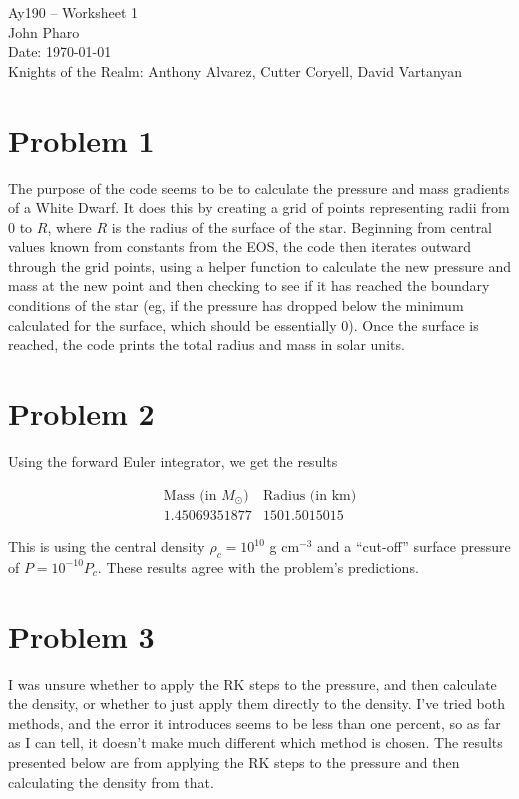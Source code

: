 \documentclass[11pt,letterpaper]{article}
\begin{document}
\begin{center}
\Large
Ay190 -- Worksheet 1\\
John Pharo\\
Date: \today \\
Knights of the Realm: Anthony Alvarez, Cutter Coryell, David Vartanyan
\end{center}

\section*{Problem 1}

The purpose of the code seems to be to calculate the pressure and mass gradients of a White Dwarf. It does this by creating a grid of points representing radii from 0 to $R$, where $R$ is the radius of the surface of the star. Beginning from central values known from constants from the EOS, the code then iterates outward through the grid points, using a helper function to calculate the new pressure and mass at the new point and then checking to see if it has reached the boundary conditions of the star (eg, if the pressure has dropped below the minimum calculated for the surface, which should be essentially 0). Once the surface is reached, the code prints the total radius and mass in solar units.

\section*{Problem 2}

Using the forward Euler integrator, we get the results

\[
\begin{array}{cc}
\text{Mass (in $M_{\odot}$)} & \text{Radius (in km)} \\
1.45069351877 & 1501.5015015
\end{array}
\]

This is using the central density $\rho_c = 10^10$ g cm$^{-3}$ and a ``cut-off'' surface pressure of $P = 10^{-10} P_c$. These results agree with the problem's predictions.

\section*{Problem 3}

I was unsure whether to apply the RK steps to the pressure, and then calculate the density, or whether to just apply them directly to the density. I've tried both methods, and the error it introduces seems to be less than one percent, so as far as I can tell, it doesn't make much different which method is chosen. The results presented below are from applying the RK steps to the pressure and then calculating the density from that.
\end{document}
